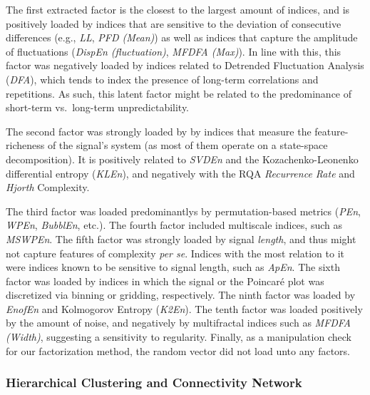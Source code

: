 \documentclass[
  man]{apa6}
\begin{document}
The first extracted factor is the closest to the largest amount of indices, and is positively loaded by indices that are sensitive to the deviation of consecutive differences (e.g., \emph{LL}, \emph{PFD (Mean)}) as well as indices that capture the amplitude of fluctuations (\emph{DispEn (fluctuation)}, \emph{MFDFA (Max)}). In line with this, this factor was negatively loaded by indices related to Detrended Fluctuation Analysis (\emph{DFA}), which tends to index the presence of long-term correlations and repetitions. As such, this latent factor might be related to the predominance of short-term vs.~long-term unpredictability.

The second factor was strongly loaded by by indices that measure the feature-richeness of the signal's system (as most of them operate on a state-space decomposition). It is positively related to \emph{SVDEn} and the Kozachenko-Leonenko differential entropy (\emph{KLEn}), and negatively with the RQA \emph{Recurrence Rate} and \emph{Hjorth} Complexity.

The third factor was loaded predominantlys by permutation-based metrics (\emph{PEn}, \emph{WPEn}, \emph{BubblEn}, etc.).
The fourth factor included multiscale indices, such as \emph{MSWPEn}.
The fifth factor was strongly loaded by signal \emph{length}, and thus might not capture features of complexity \emph{per se}. Indices with the most relation to it were indices known to be sensitive to signal length, such as \emph{ApEn}.
The sixth factor was loaded by indices in which the signal or the Poincaré plot was discretized via binning or gridding, respectively.
The ninth factor was loaded by \emph{EnofEn} and Kolmogorov Entropy (\emph{K2En}).
The tenth factor was loaded positively by the amount of noise, and negatively by multifractal indices such as \emph{MFDFA (Width)}, suggesting a sensitivity to regularity.
Finally, as a manipulation check for our factorization method, the random vector did not load unto any factors.

\hypertarget{hierarchical-clustering-and-connectivity-network}{%
\subsubsection{Hierarchical Clustering and Connectivity Network}\label{hierarchical-clustering-and-connectivity-network}}
\end{document}
